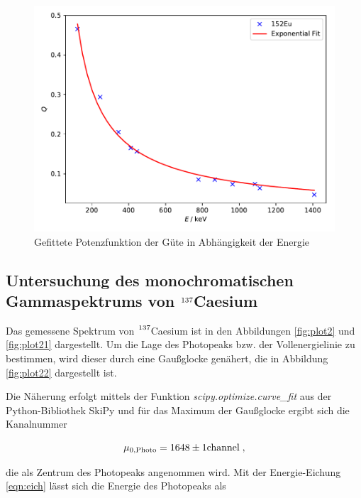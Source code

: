 \begin{figure}[H]
  \centering
  \includegraphics[scale=0.6]{content/plot6.pdf}
  \caption{Gefittete Potenzfunktion der Güte in Abhängigkeit der Energie}
  \label{fig:plot6}
\end{figure}


\subsection{Untersuchung des monochromatischen Gammaspektrums von $\ce{^{137}}$Caesium}

Das gemessene Spektrum von $\ce{^{137}}$Caesium ist in den Abbildungen \ref{fig:plot2} und \ref{fig:plot21} dargestellt.
Um die Lage des Photopeaks bzw. der Vollenergielinie zu bestimmen, wird dieser durch eine Gaußglocke genähert, die in Abbildung
\ref{fig:plot22} dargestellt ist.

Die Näherung erfolgt mittels der Funktion \textit{scipy.optimize.curve\_fit} aus der Python-Bibliothek SkiPy und für
das Maximum der Gaußglocke ergibt sich die Kanalnummer

\begin{equation*}
  \mu_{0,\text{Photo}} = \num{1648 +- 1} \text{channel}\; ,
\end{equation*}

die als Zentrum des Photopeaks angenommen wird.
Mit der Energie-Eichung \eqref{eqn:eich} lässt sich die Energie des Photopeaks als

